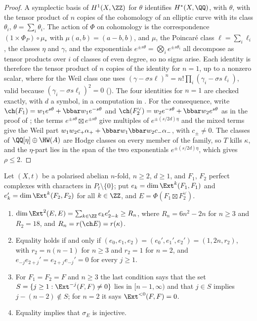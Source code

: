 \begin{proof}
A symplectic basis of $H^{1}(X,\ZZ)$ for $\theta$ identifies $H^{*}(X,\QQ)$,
with $\theta$, with the tensor product of $n$ copies of the cohomology of an
elliptic curve with its class $\theta_{i}$, $\theta=\sum_{i}\theta_{i}$. The
action of $\Phi$ on cohomology is the correspondence $(1\times\Phi_{P})\circ
\mu_{*}$ with $\mu(a,b)=(a-b,b)$, and $\mu$, the Poincar\'e class
$\ell=\sum_{i}\ell_{i}$, the classes $\eta$ and $\gamma$, and the exponentials
$e^{\pm s\theta}=\bigotimes_{i}e^{\pm s\theta_{i}}$ all decompose as tensor
products over $i$ of classes of even degree, so no signs arise. Each identity
is therefore the tensor product of $n$ copies of the identity for $n=1$, up to
a nonzero scalar, where for the Weil class one uses
$(\gamma-\sigma s\ell)^{n}=n!\prod_{i}(\gamma_{i}-\sigma s\ell_{i})$, valid because
$(\gamma_{i}-\sigma s\ell_{i})^{2}=0$ (). The four identities
for $n=1$ are checked exactly, with $d$ a symbol, in a computation in \cite{BMB26}. For the consequence, write
$\ch(F_{1})=w_{1}e^{s\theta}+\bbar w_{1}e^{-s\theta}$ and
$\ch(F_{2}^{\vee})=w_{2}e^{-s\theta}+\bbar w_{2}e^{s\theta}$ as in the proof of
; the terms $e^{\pm s\theta}\boxtimes e^{\pm s\theta}$
give multiples of $e^{\pm(s/2d)\eta}$ and the mixed terms give the Weil part
$w_{1}w_{2}c_{+}\alpha_{+}+\bbar w_{1}\bbar w_{2}c_{-}\alpha_{-}$, with
$c_{\pm}\ne0$. The classes of $\QQ[\eta]\oplus\HW(A)$ are Hodge classes on
every member of the family, so $T$ kills $\kappa$, and the $\eta$-part lies in
the span of the two exponentials $e^{\pm(s/2d)\eta}$, which gives $\rho\le2$.
\end{proof}

\begin{proposition}
\label{prop:orlovequality}
Let $(X,t)$ be a polarised abelian $n$-fold, $n\ge2$, $d\ge1$, and $F_{1}$,
$F_{2}$ perfect complexes with characters in $P_{t}\setminus\{0\}$; put
$e_{k}=\dim\Ext^{k}(F_{1},F_{1})$ and $e_{k}'=\dim\Ext^{k}(F_{2},F_{2})$ for all
$k\in\ZZ$, and $E=\Phi(F_{1}\boxtimes F_{2}^{\vee})$.
\begin{enumerate}[label=\textup{(\roman*)},leftmargin=2.6em,itemsep=2pt]
\item $\dim\Ext^{2}(E,E)=\sum_{k\in\ZZ}e_{k}e_{2-k}'\ge R_{n}$, where
  $R_{n}=6n^{2}-2n$ for $n\ge3$ and $R_{2}=18$, and $R_{n}=r(\ch E)=r(\kappa)$.
\item Equality holds if and only if $(e_{0},e_{1},e_{2})=(e_{0}',e_{1}',e_{2}')
  =(1,2n,r_{2})$, with $r_{2}=n(n-1)$ for $n\ge3$ and $r_{2}=1$ for $n=2$, and
  $e_{-j}e_{2+j}'=e_{2+j}e_{-j}'=0$ for every $j\ge1$.
\item For $F_{1}=F_{2}=F$ and $n\ge3$ the last condition says that the set
  $S=\{j\ge1:\Ext^{-j}(F,F)\ne0\}$ lies in $[n-1,\infty)$ and that $j\in S$
  implies $j-(n-2)\notin S$; for $n=2$ it says $\Ext^{<0}(F,F)=0$.
\item Equality implies that $\sigma_{E}$ is injective.
\end{enumerate}
\end{proposition}

